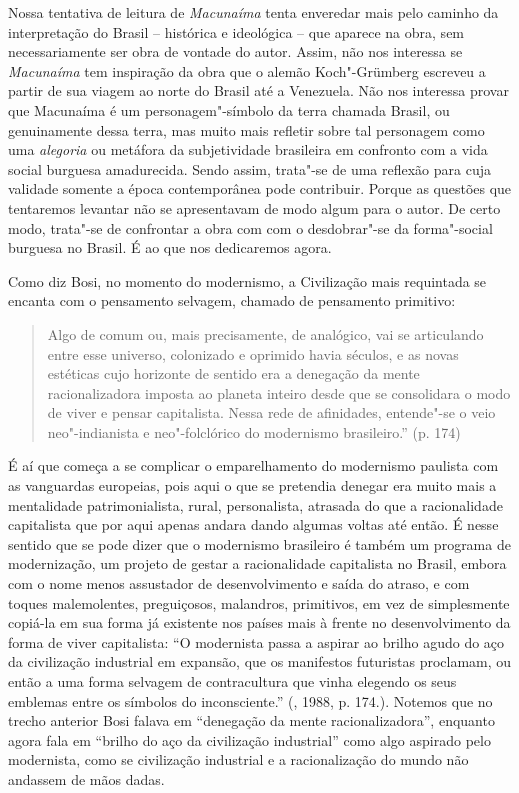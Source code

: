 Nossa tentativa de leitura de \emph{Macunaíma} tenta enveredar mais pelo
caminho da interpretação do Brasil -- histórica e ideológica -- que
aparece na obra, sem necessariamente ser obra de vontade do autor.
Assim, não nos interessa se \emph{Macunaíma} tem inspiração da obra que
o alemão Koch"-Grümberg escreveu a partir de sua viagem ao norte do
Brasil até a Venezuela. Não nos interessa provar que Macunaíma é um
personagem"-símbolo da terra chamada Brasil, ou genuinamente dessa terra,
mas muito mais refletir sobre tal personagem como uma \emph{alegoria} ou
metáfora da subjetividade brasileira em confronto com a vida social
burguesa amadurecida. Sendo assim, trata"-se de uma reflexão para cuja
validade somente a época contemporânea pode contribuir. Porque as
questões que tentaremos levantar não se apresentavam de modo algum para
o autor. De certo modo, trata"-se de confrontar a obra com com o
desdobrar"-se da forma"-social burguesa no Brasil. É ao que nos
dedicaremos agora.

Como diz Bosi, no momento do modernismo, a Civilização mais requintada
se encanta com o pensamento selvagem, chamado de pensamento primitivo:

\begin{quote}
Algo de comum ou, mais precisamente, de analógico, vai se articulando
entre esse universo, colonizado e oprimido havia séculos, e as novas
estéticas cujo horizonte de sentido era a denegação da mente
racionalizadora imposta ao planeta inteiro desde que se consolidara o
modo de viver e pensar capitalista. Nessa rede de afinidades, entende"-se
o veio neo"-indianista e neo"-folclórico do modernismo brasileiro.'' (p.
174)
\end{quote}

É aí que começa a se complicar o emparelhamento do modernismo paulista
com as vanguardas europeias, pois aqui o que se pretendia denegar era
muito mais a mentalidade patrimonialista, rural, personalista, atrasada
do que a racionalidade capitalista que por aqui apenas andara dando
algumas voltas até então. É nesse sentido que se pode dizer que o
modernismo brasileiro é também um programa de modernização, um projeto
de gestar a racionalidade capitalista no Brasil, embora com o nome menos
assustador de desenvolvimento e saída do atraso, e com toques
malemolentes, preguiçosos, malandros, primitivos, em vez de simplesmente
copiá-la em sua forma já existente nos países mais à frente no
desenvolvimento da forma de viver capitalista: ``O modernista passa a
aspirar ao brilho agudo do aço da civilização industrial em expansão,
que os manifestos futuristas proclamam, ou então a uma forma selvagem de
contracultura que vinha elegendo os seus emblemas entre os símbolos do
inconsciente.'' (, 1988, p. 174.). Notemos que no trecho anterior
Bosi falava em ``denegação da mente racionalizadora'', enquanto agora
fala em ``brilho do aço da civilização industrial'' como algo aspirado
pelo modernista, como se civilização industrial e a racionalização do
mundo não andassem de mãos dadas.

